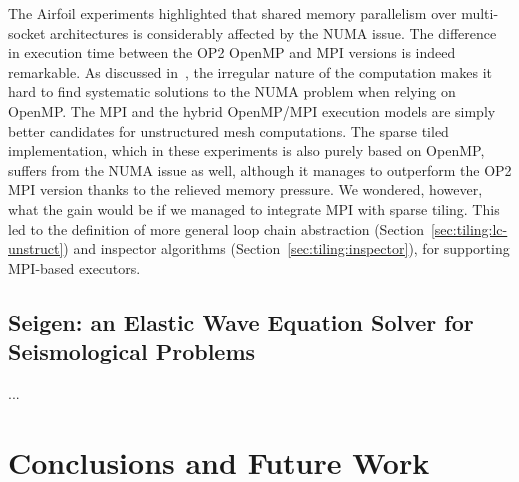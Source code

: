 The Airfoil experiments highlighted that shared memory parallelism over multi-socket architectures is considerably affected by the NUMA issue. The difference in execution time between the OP2 OpenMP and MPI versions is indeed remarkable. As discussed in~\cite{hydra-op2}, the irregular nature of the computation makes it hard to find systematic solutions to the NUMA problem when relying on OpenMP. The MPI and the hybrid OpenMP/MPI execution models are simply better candidates for unstructured mesh computations. The sparse tiled implementation, which in these experiments is also purely based on OpenMP, suffers from the NUMA issue as well, although it manages to outperform the OP2 MPI version thanks to the relieved memory pressure. We wondered, however, what the gain would be if we managed to integrate MPI with sparse tiling. This led to the definition of more general loop chain abstraction (Section~\ref{sec:tiling:lc-unstruct}) and inspector algorithms (Section~\ref{sec:tiling:inspector}), for supporting MPI-based executors.

\subsection{Seigen: an Elastic Wave Equation Solver for Seismological Problems}
\label{sec:tiling:seigen}
...

\section{Conclusions and Future Work}
